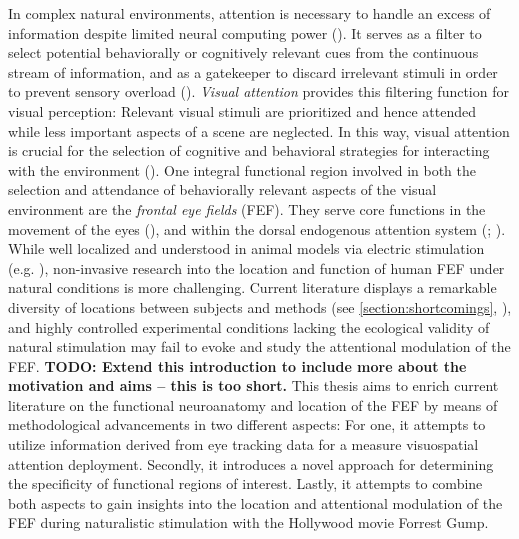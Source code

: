 \documentclass[a4paper, 12pt]{scrreprt}
\begin{document}
In complex natural environments, attention is necessary to handle an excess of information despite limited neural computing power (\cite{carrasco2011visual}). It serves as a filter to select potential behaviorally or cognitively relevant cues from the continuous stream of information, and as a gatekeeper to discard irrelevant stimuli in order to prevent sensory overload (\cite{bellebaum2012neuropsych}). \textit{Visual attention} provides this filtering function for visual perception: Relevant visual stimuli are prioritized and hence attended while less important aspects of a scene are neglected. In this way, visual attention is crucial for the selection of cognitive and behavioral strategies for interacting with the environment (\cite{siegelbaum2000neuro}).\newline
One integral functional region involved in both the selection and attendance of behaviorally relevant aspects of the visual environment are the \textit{frontal eye fields} (FEF). They serve core functions in the movement of the eyes (\cite{krauzlis2014eye}), and within the dorsal endogenous attention system (\cite{corbetta2002control}; \cite{corbetta2008reorienting}). While well localized and understood in animal models via electric stimulation (e.g. \cite{bruce1985primate}), non-invasive research into the location and function of human FEF under natural conditions is more challenging. Current literature displays a remarkable diversity of locations between subjects and methods (see \ref{section:shortcomings}, \cite{vernet2014corrigendum}), and highly controlled experimental conditions lacking the ecological validity of natural stimulation may fail to evoke and study the attentional modulation of the FEF. \newline
\textbf{TODO: Extend this introduction to include more about the motivation and aims -- this is too short.}
This thesis aims to enrich current literature on the functional neuroanatomy and location of the FEF by means of methodological advancements in two different aspects: For one, it attempts to utilize information derived from eye tracking data for a measure visuospatial attention deployment. Secondly, it introduces a novel approach for determining the specificity of functional regions of interest. Lastly, it attempts to combine both aspects to gain insights into the location and attentional modulation of the FEF during naturalistic stimulation with the Hollywood movie Forrest Gump. \newline
\end{document}
